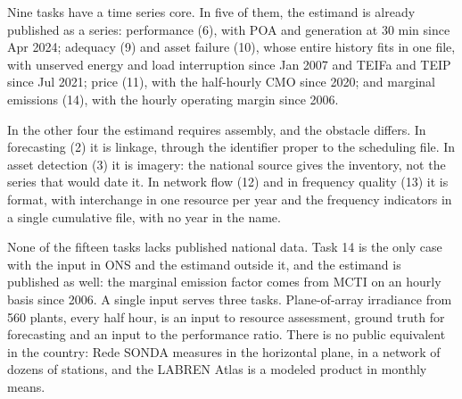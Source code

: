 \documentclass[10pt,a4paper,oneside]{book}
\begin{document}
\begin{landscape}

\par\vspace{1.1em}

\begin{promancha}
Nine tasks have a time series core. In five of them, the estimand is already
published as a series: performance (6), with POA and generation at 30 min since
Apr 2024; adequacy (9) and asset failure (10), whose entire history fits in one
file, with unserved energy and load interruption since Jan 2007 and TEIFa and
TEIP since Jul 2021; price (11), with the half-hourly CMO since 2020; and
marginal emissions (14), with the hourly operating margin since 2006.

In the other four the estimand requires assembly, and the obstacle differs. In
forecasting (2) it is linkage, through the identifier proper to the scheduling
file. In asset detection (3) it is imagery: the national source gives the
inventory, not the series that would date it. In network flow (12) and in
frequency quality (13) it is format, with interchange in one resource per year
and the frequency indicators in a single cumulative file, with no year in the
name.

None of the fifteen tasks lacks published national data. Task 14 is the only case
with the input in ONS and the estimand outside it, and the estimand is published
as well: the marginal emission factor comes from MCTI on an hourly basis since
2006.
A single input serves three tasks. Plane-of-array irradiance from
560 plants, every half hour, is an input to resource assessment, ground truth
for forecasting and an input to the performance ratio. There is no public
equivalent in the country: Rede SONDA measures in the horizontal plane, in a
network of dozens of stations, and the LABREN Atlas is a modeled product in
monthly means.
\end{promancha}


\end{landscape}
\end{document}
